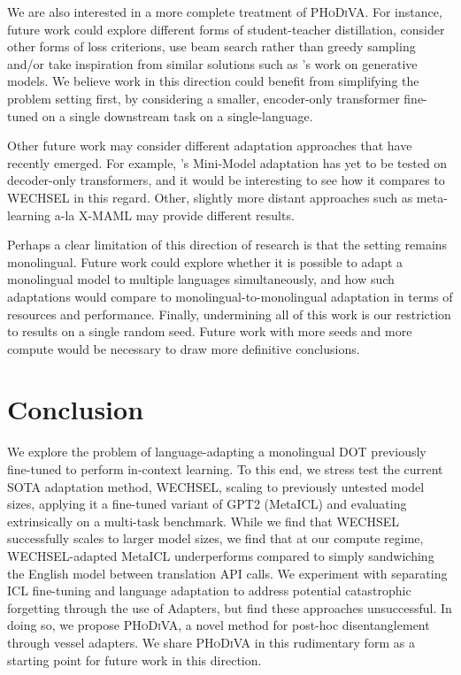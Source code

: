 \documentclass[11pt]{article}
\begin{document}
We are also interested in a more complete treatment of \textsc{PHoDiVA}. For instance, future work
could explore different forms of student-teacher distillation, consider other forms of loss
criterions, use beam search rather than greedy sampling and/or take inspiration from similar
solutions such as \citet{khrulkov_disentangled_2021}'s work on generative models. We believe work in
this direction could benefit from simplifying the problem setting first, by considering a smaller,
encoder-only transformer fine-tuned on a single downstream task on a single-language.

Other future work may consider different adaptation approaches that have recently emerged. For
example, \citet{marchisio_mini-model_2022}'s Mini-Model adaptation has yet to be tested on
decoder-only transformers, and it would be interesting to see how it compares to WECHSEL in this
regard. Other, slightly more distant approaches such as meta-learning a-la X-MAML
\citep{nooralahzadeh_zero-shot_2020} may provide different results.

Perhaps a clear limitation of this direction of research is that the setting remains monolingual.
Future work could explore whether it is possible to adapt a monolingual model to multiple languages
simultaneously, and how such adaptations would compare to monolingual-to-monolingual adaptation in
terms of resources and performance. Finally, undermining all of this work is our restriction to
results on a single random seed. Future work with more seeds and more compute would be necessary to
draw more definitive conclusions.


\section{Conclusion}

We explore the problem of language-adapting a monolingual DOT previously fine-tuned to perform
in-context learning. To this end, we stress test the current SOTA adaptation method, WECHSEL,
scaling to previously untested model sizes, applying it a fine-tuned variant of GPT2 (MetaICL) and
evaluating extrinsically on a multi-task benchmark. While we find that WECHSEL successfully scales
to larger model sizes, we find that at our compute regime, WECHSEL-adapted MetaICL underperforms
compared to simply sandwiching the English model between translation API calls. We experiment with
separating ICL fine-tuning and language adaptation to address potential catastrophic forgetting
through the use of Adapters, but find these approaches unsuccessful. In doing so, we propose
\textsc{PHoDiVA}, a novel method for post-hoc disentanglement through vessel adapters. We share
\textsc{PHoDiVA} in this rudimentary form as a starting point for future work in this direction.
\end{document}
